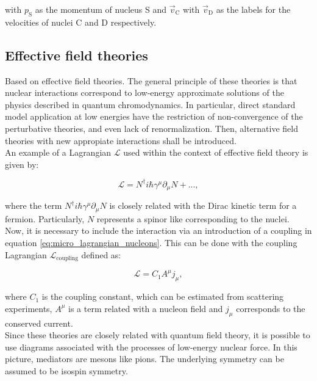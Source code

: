 \documentclass[openany]{book}
\begin{document}
with $p_\mathrm{S}$ as the momentum of nucleus S and $\vec v_\mathrm{C}$ with  $\vec v_\mathrm{D}$ as the labels for the velocities of nuclei C and D respectively. 

\subsection{Effective field theories} \label{sub:special_effectiveField}

Based on effective field theories. The general principle of these theories is that nuclear interactions correspond to low-energy approximate solutions of the physics described in quantum chromodynamics. In particular, direct standard model application at low energies have the restriction of non-convergence of the perturbative theories, and even lack of renormalization. Then, alternative field theories with new appropiate interactions shall be introduced. \\

An example of a Lagrangian $\mathcal{L}$ used within the context of effective field theory is given by: 

\begin{equation} \label{eq:micro_lagrangian_nucleons}
	\mathcal{L} = N^{\dagger}i\hbar\gamma^\mu\partial_\mu N + ... ,
\end{equation}

where the term $ N^{\dagger}i\hbar\gamma^\mu\partial_\mu N$ is closely related with the Dirac kinetic term for a fermion. Particularly, $N$ represents a spinor like corresponding to the nuclei. \\

Now, it is necessary to include the interaction via an introduction of a coupling in equation \ref{eq:micro_lagrangian_nucleons}. This can be done with the coupling Lagrangian  $	\mathcal{L}_{\mathrm{coupling}} $ defined as: 

 \begin{equation} \label{eq:micro_lagrangian_coupling}
 	\mathcal{L} =  C_1 A^\mu j_\mu ,
 \end{equation}

where $C_1$ is the coupling constant, which can be estimated from scattering experiments, $A^\mu $ is a term related with a nucleon field and $j_\mu$ corresponds to the conserved current.  \\

Since these theories are closely related with quantum field theory, it is possible to use diagrams associated with the processes of low-energy nuclear force. In this picture, mediators are mesons like pions. The underlying symmetry can be assumed to be isospin symmetry.  \\
\end{document}
